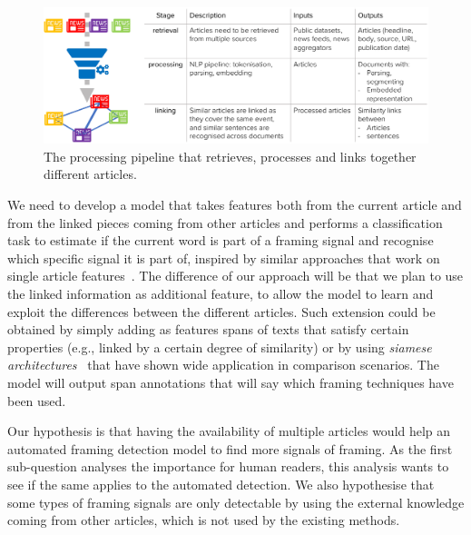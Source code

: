 \begin{figure}[!htb]
    \centering
    \includegraphics[width=\textwidth]{figures/figure_pipeline.pdf}
    \caption{The processing pipeline that retrieves, processes and links together different articles.}
    \label{fig:pipeline}
\end{figure}

We need to develop a model that takes features both from the current article and from the linked pieces coming from other articles and performs a classification task to estimate if the current word is part of a framing signal and recognise which specific signal it is part of, inspired by similar approaches that work on single article features~\cite{da2019fine}.
The difference of our approach will be that we plan to use the linked information as additional feature, to allow the model to learn and exploit the differences between the different articles.
Such extension could be obtained by simply adding as features spans of texts that satisfy certain properties (e.g., linked by a certain degree of similarity) or by using \emph{siamese architectures}~\cite{bromley1994signature} that have shown wide application in comparison scenarios.
The model will output span annotations that will say which framing techniques have been used.


Our hypothesis is that having the availability of multiple articles would help an automated framing detection model to find more signals of framing.
As the first sub-question analyses the importance for human readers, this analysis wants to see if the same applies to the automated detection.
We also hypothesise that some types of framing signals are only detectable by using the external knowledge coming from other articles, which is not used by the existing methods.


